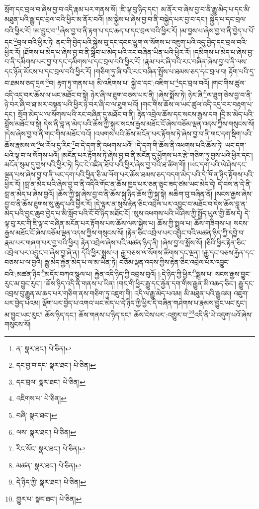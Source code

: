 སྲོག་དང་བྲལ་བ་ཞེས་བྱ་བ་འདི་རྣམ་པར་གནས་སོ། །ཇི་ལྟ་བུ་ཉིད་དང་། མ་ནོར་བ་ཞེས་བྱ་བ་ནི་རྒྱུ་མེད་པ་དང་མི་མཐུན་པའི་རྒྱུ་དང་བྲལ་བའི་ཕྱིར་མ་ནོར་བའོ། །མ་སྐྱེས་པ་ཞེས་བྱ་བ་ནི་བསྐྱེད་པར་བྱ་བ་དང་། སྐྱེད་པ་དང་བྲལ་བའི་ཕྱིར་རོ། །མ་བྱུང་བ་\footnote{ན་  སྣར་ཐང་།  པེ་ཅིན། }ཞེས་བྱ་བ་ནི་རྟག་པ་དང་ཆད་པ་དང་བྲལ་བའི་ཕྱིར་རོ། །མ་བྱས་པ་ཞེས་བྱ་བ་ནི་བྱེད་པ་པོ་དང་\footnote{དང་བྱ་བ་དང་  སྣར་ཐང་།  པེ་ཅིན། }བྲལ་བའི་ཕྱིར་ཏེ། ནང་གི་བྱེད་པའི་སྐྱེས་བུ་དང་དབང་ཕྱུག་ལ་སོགས་པ་འཇུག་པའི་འདུ་བྱེད་དང་བྲལ་བའི་ཕྱིར་རོ། །ཐོགས་པ་མེད་པ་ཞེས་བྱ་བ་ནི་སྒྲིབ་པ་མེད་པའི་རང་བཞིན་ཡིན་པའི་ཕྱིར་རོ། །དམིགས་པ་མེད་པ་ཞེས་བྱ་བ་ནི་དམིགས་པར་བྱ་བ་དང་དམིགས་པ་དང་བྲལ་བའི་ཕྱིར་རོ། །རྣམ་པར་ཞི་བའི་རང་བཞིན་ཞེས་བྱ་བ་ནི་ལས་དང་ཉོན་མོངས་པ་དང་བྲལ་བའི་ཕྱིར་རོ། །གཅིག་ཏུ་ཞི་བའི་རང་བཞིན་སྤྲོས་པ་ཐམས་ཅད་དང་བྲལ་བ། རྟོག་པའི་དྲ་བ་ཐམས་ཅད་དྲལ་\footnote{དང་བྲལ་  སྣར་ཐང་།  པེ་ཅིན། }བ། རྟག་ཏུ་གནས་པ། མི་འཇིགས་པ། སྐྱེ་བ་དང་:འཇིག་པ་\footnote{འཇིགས་པ་  པེ་ཅིན། }དང་བྲལ་བའོ། །གང་གིས་ཚུལ་འདི་འདྲ་བར་ཆོས་ལ་ཡང་མཐོང་བ་སྟེ། ཉེར་ཞི་ལ་ཐུག་བཅས་པར་ནི། །ཞེས་སྨོས་ཏེ། ཉེར་ཞི་\footnote{བཞི་  སྣར་ཐང་། }ལ་ཐུག་ཅེས་བྱ་བ་ནི་ཉེ་བར་ཞི་བ་ཐ་མར་བསྟན་པའི་ཕྱིར་ཉེ་བར་ཞི་བ་ལ་ཐུག་པའོ། །གང་གིས་ཆོས་ལ་ཡང་ཚུལ་འདི་འདྲ་བར་བརྟག་པ་དང་། སྲོག་མེད་པ་ལ་སོགས་པའི་རང་བཞིན་དུ་མཐོང་བ་ནི། རྟེན་འབྲེལ་ཆོས་དང་སངས་རྒྱས་དག །དྲི་མ་མེད་པའི་བློས་མཐོང་བ་སྟེ། དེས་ནི་བླ་ན་མེད་པའི་ཆོས་ཀྱི་སྐུར་སངས་རྒྱས་མཐོང་ངོ་ཞེས་བཅོམ་ལྡན་འདས་ཀྱིས་གསུངས་སོ། །དེས་ཞེས་བྱ་བ་ནི་གང་གིས་མཐོང་བའོ། །འཕགས་པའི་ཆོས་མངོན་པར་རྟོགས་ཏེ་ཞེས་བྱ་བ་ནི་གང་དག་སྡིག་པའི་ཆོས་རྣམས་ལ་\footnote{ལས་  སྣར་ཐང་།  པེ་ཅིན། }ཕ་རོལ་དུ་རིང་\footnote{རིང་སོང་  སྣར་ཐང་།  པེ་ཅིན། }བ་དེ་དག་ནི་འཕགས་པའོ། །དེ་དག་གི་ཆོས་ནི་འཕགས་པའི་ཆོས་ཏེ། ཡང་དག་པའི་ལྟ་བ་ལ་སོགས་པའོ། །མངོན་པར་རྟོགས་ཏེ་ཞེས་བྱ་བ་ནི་མངོན་དུ་ཕྱོགས་པར་རྩེ་གཅིག་ཏུ་བྱས་པའི་ཕྱིར་དང་། མངོན་སུམ་དུ་བྱས་པའི་ཕྱིར་ཏེ། ཏིང་ངེ་འཛིན་ཐོབ་པའི་ཕྱིར་ཞེས་བྱ་བའི་ཐ་ཚིག་གོ། །ཡང་དག་པའི་ཡེ་ཤེས་དང་ལྡན་པས་ཞེས་བྱ་བ་ནི་ཡང་དག་པའི་ཕྱིན་ཅི་མ་ལོག་པར་ཆོས་ཐམས་ཅད་བདག་མེད་པའི་དེ་ཁོ་ན་ཉིད་རྟོགས་པའི་ཕྱིར་རོ། །བླ་ན་མེད་པའི་ཞེས་བྱ་བ་ནི་འདིའི་གོང་ན་ཆོས་ཁྱད་པར་ཅན་ཅུང་ཟད་ཙམ་ཡང་མེད་དེ། དེ་བས་ན་དེ་ནི་བླ་ན་མེད་པ་ཞེས་བྱའོ། །ཆོས་ཀྱི་སྐུ་ཞེས་བྱ་བ་ནི་ཆོས་སྐུ་ཉིད་ཆོས་ཀྱི་སྐུ་སྟེ། མཆིག་བུ་བཞིན་ནོ། །སངས་རྒྱས་ཞེས་བྱ་བ་ནི་ཆོས་ཐུགས་སུ་ཆུད་པའི་ཕྱིར་རོ། །དེ་ལྟར་ན་སུས་རྟེན་ཅིང་འབྲེལ་པར་འབྱུང་བ་མཐོང་བ་དེས་ཆོས་བླ་ན་མེད་པའི་བྱང་ཆུབ་བྱེད་པ་མི་སློབ་པའི་ངོ་བོ་ཉིད་མཐོང་ངོ། །སུས་འཕགས་པའི་ཡེ་ཤེས་ཀྱི་སྤྱོད་ཡུལ་གྱི་ཆོས་དེ། དེ་ལྟ་བུ་རང་གི་ཇི་ལྟ་བ་བཞིན་མངོན་པར་རྟོགས་པས་ཆོས་ལས་སྐྱེས་པ། ཆོས་ཀྱི་སྤྲུལ་པ། ཆོས་གཟིགས་པ། སངས་རྒྱས་མཐོང་ངོ་ཞེས་བཅོམ་ལྡན་འདས་ཀྱིས་གསུངས་སོ། །རྟེན་ཅིང་འབྲེལ་པར་འབྱུང་བའི་མཚན་ཉིད་ཀྱི་དབྱེ་བ་རྣམ་པར་གཞག་པར་བྱ་བའི་ཕྱིར། རྟེན་འབྲེལ་ཞེས་པའི་མཚན་ཉིད་ནི། །ཞེས་བྱ་བ་སྨོས་སོ། །ཅིའི་ཕྱིར་རྟེན་ཅིང་འབྲེལ་པར་འབྱུང་བ་ཞེས་བྱ་ཞེ་ན། དེའི་ཕྱིར་སྨྲས་པ། རྒྱུ་བཅས་ལ་སོགས་ཚིགས་དང་ལྡན། །རྒྱུ་དང་བཅས་རྐྱེན་དང་བཅས་པ་ལ་བྱའི། རྒྱུ་མེད་རྐྱེན་མེད་པ་ལ་མ་ཡིན་ཏེ། བཅོམ་ལྡན་འདས་ཀྱིས་རྟེན་ཅིང་འབྲེལ་པར་འབྱུང་བའི་:མཚན་ཉིད་\footnote{མཚན་  སྣར་ཐང་།  པེ་ཅིན། }མདོར་བཀའ་སྩལ་པ། རྐྱེན་འདི་ཉིད་ཀྱི་འབྲས་བུའོ། །:དེ་ཉིད་ཀྱི་ཕྱིར་\footnote{དེ་ཉིད་ཀྱི་  སྣར་ཐང་།  པེ་ཅིན། }སྨྲས་པ། སངས་རྒྱས་བྱུང་རུང་མ་བྱུང་རུང་། །ཆོས་ཉིད་འདི་ནི་གནས་པ་ཡིན། །གང་གི་ཕྱིར་རྒྱུ་དང་རྐྱེན་དག་གིས་རྒྱུན་མི་འཆད་ཅིང་། རྒྱུ་དང་འབྲས་བུ་རྒྱུན་མ་ཆད་པར་གཅིག་ནས་གཅིག་ཏུ་འཇུག་གི། འདི་ལ་རྒྱུ་མེད་པའམ། མི་མཐུན་པའི་རྒྱུའམ། འཇུག་པར་བྱེད་པའམ། ལྡོག་པར་བྱེད་པ་འགའ་ཡང་མེད་པ་དེ་ཉིད་ཀྱི་ཕྱིར་དེ་བཞིན་གཤེགས་པ་རྣམས་བྱུང་ཡང་རུང་། མ་བྱུང་ཡང་རུང་། ཆོས་ཉིད་དང་། ཆོས་གནས་པ་ཉིད་དང་། ཆོས་ངེས་པར་:འགྱུར་བ་\footnote{གྱུར་པ་  སྣར་ཐང་།  པེ་ཅིན། }འདི་ནི་ཡེ་འདུག་པའོ་ཞེས་གསུངས་སོ། 